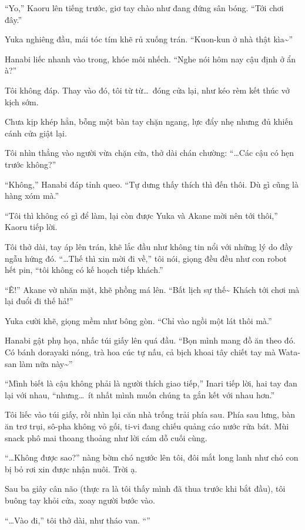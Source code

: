\documentclass[../main.tex]{subfiles}
\begin{document}
``Yo,'' Kaoru lên tiếng trước, giơ tay chào như đang đứng sân bóng. ``Tới chơi đây.''

Yuka nghiêng đầu, mái tóc tím khẽ rủ xuống trán. ``Kuon-kun ở nhà thật kìa\~{}''

Hanabi liếc nhanh vào trong, khóe môi nhếch. ``Nghe nói hôm nay cậu định ở ẩn à?''

Tôi không đáp. Thay vào đó, tôi từ từ\dots\ đóng cửa lại, như kéo rèm kết thúc vở kịch sớm.

Chưa kịp khép hẳn, bỗng một bàn tay chặn ngang, lực đẩy nhẹ nhưng đủ khiến cánh cửa giật lại.

Tôi nhìn thẳng vào người vừa chặn cửa, thở dài chán chường: ``\dots Các cậu có hẹn trước không?''

``Không,'' Hanabi đáp tỉnh queo. ``Tự dưng thấy thích thì đến thôi. Dù gì cũng là hàng xóm mà.''

``Tôi thì không có gì để làm, lại còn được Yuka và Akane mời nên tới thôi,'' Kaoru tiếp lời.

Tôi thở dài, tay áp lên trán, khẽ lắc đầu như không tin nổi với những lý do đầy ngẫu hứng đó. ``\dots Thế thì xin mời đi về,'' tôi nói, giọng đều đều như con robot hết pin, ``tôi không có kế hoạch tiếp khách.''

``Ê!'' Akane vờ nhăn mặt, khẽ phồng má lên. ``Bất lịch sự thế\~{} Khách tới chơi mà lại đuổi đi thế hả!''

Yuka cười khẽ, giọng mềm như bông gòn. ``Chỉ vào ngồi một lát thôi mà.''

Hanabi gật phụ họa, nhấc túi giấy lên quá đầu. ``Bọn mình mang đồ ăn theo đó. Có bánh dorayaki nóng, trà hoa cúc tự nấu, cả bịch khoai tây chiết tay mà Wata-san làm nữa này\~{}''

``Mình biết là cậu không phải là người thích giao tiếp,'' Inari tiếp lời, hai tay đan lại với nhau, ``nhưng\dots\ ít nhất mình muốn chúng ta gắn kết với nhau hơn.''

Tôi liếc vào túi giấy, rồi nhìn lại căn nhà trống trải phía sau. Phía sau lưng, bàn ăn trơ trụi, sô-pha không vỏ gối, ti-vi đang chiếu quảng cáo nước rửa bát. Mùi snack phô mai thoang thoảng như lời cám dỗ cuối cùng.

``\dots Không được sao?'' nàng bờm chó ngước lên tôi, đôi mắt long lanh như chó con bị bỏ rơi xin được nhận nuôi. Trời ạ.

Sau ba giây cân não (thực ra là tôi thấy mình đã thua trước khi bắt đầu), tôi buông tay khỏi cửa, xoay người bước vào.

``\dots Vào đi,'' tôi thở dài, như tháo van. ``''
\end{document}
